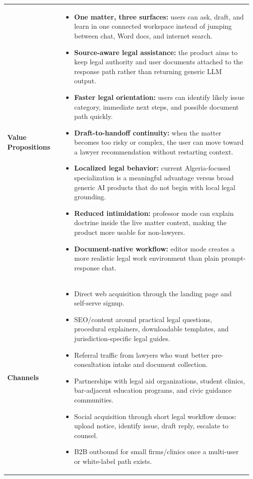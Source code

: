 \documentclass[11pt]{article}
\begin{document}
\begin{longtable}{p{} p{}}
\textbf{Value Propositions} &
\begin{itemize}
  \item \textbf{One matter, three surfaces:} users can ask, draft, and learn in one connected workspace instead of jumping between chat, Word docs, and internet search.
  \item \textbf{Source-aware legal assistance:} the product aims to keep legal authority and user documents attached to the response path rather than returning generic LLM output.
  \item \textbf{Faster legal orientation:} users can identify likely issue category, immediate next steps, and possible document path quickly.
  \item \textbf{Draft-to-handoff continuity:} when the matter becomes too risky or complex, the user can move toward a lawyer recommendation without restarting context.
  \item \textbf{Localized legal behavior:} current Algeria-focused specialization is a meaningful advantage versus broad generic AI products that do not begin with local legal grounding.
  \item \textbf{Reduced intimidation:} professor mode can explain doctrine inside the live matter context, making the product more usable for non-lawyers.
  \item \textbf{Document-native workflow:} editor mode creates a more realistic legal work environment than plain prompt-response chat.
\end{itemize} \\

\textbf{Channels} &
\begin{itemize}
  \item Direct web acquisition through the landing page and self-serve signup.
  \item SEO/content around practical legal questions, procedural explainers, downloadable templates, and jurisdiction-specific legal guides.
  \item Referral traffic from lawyers who want better pre-consultation intake and document collection.
  \item Partnerships with legal aid organizations, student clinics, bar-adjacent education programs, and civic guidance communities.
  \item Social acquisition through short legal workflow demos: upload notice, identify issue, draft reply, escalate to counsel.
  \item B2B outbound for small firms/clinics once a multi-user or white-label path exists.
\end{itemize} \\


\end{longtable}
\end{document}
